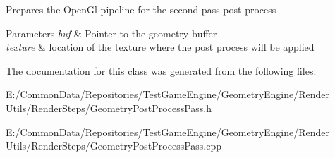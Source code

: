 Prepares the Open\+Gl pipeline for the second pass post process 
\begin{DoxyParams}{Parameters}
{\em buf} & Pointer to the geometry buffer \\
\hline
{\em texture} & location of the texture where the post process will be applied \\
\hline
\end{DoxyParams}


The documentation for this class was generated from the following files\+:\begin{DoxyCompactItemize}
\item 
E\+:/\+Common\+Data/\+Repositories/\+Test\+Game\+Engine/\+Geometry\+Engine/\+Render Utils/\+Render\+Steps/Geometry\+Post\+Process\+Pass.\+h\item 
E\+:/\+Common\+Data/\+Repositories/\+Test\+Game\+Engine/\+Geometry\+Engine/\+Render Utils/\+Render\+Steps/Geometry\+Post\+Process\+Pass.\+cpp\end{DoxyCompactItemize}
